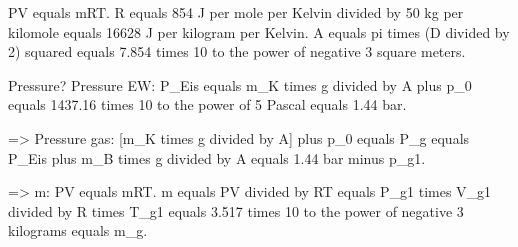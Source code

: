 PV equals mRT.  
R equals 854 J per mole per Kelvin divided by 50 kg per kilomole equals 16628 J per kilogram per Kelvin.  
A equals pi times (D divided by 2) squared equals 7.854 times 10 to the power of negative 3 square meters.  

Pressure? Pressure EW:  
P_Eis equals m_K times g divided by A plus p_0 equals 1437.16 times 10 to the power of 5 Pascal equals 1.44 bar.  

=> Pressure gas:  
[m_K times g divided by A] plus p_0 equals P_g equals P_Eis plus m_B times g divided by A equals 1.44 bar minus p_g1.  

=> m: PV equals mRT.  
m equals PV divided by RT equals P_g1 times V_g1 divided by R times T_g1 equals 3.517 times 10 to the power of negative 3 kilograms equals m_g.